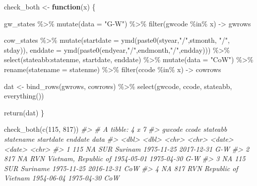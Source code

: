 \documentclass[
  11pt,
]{article}
\newenvironment{Shaded}{\begin{snugshade}}{\end{snugshade}}
\newcommand{\AttributeTok}[1]{\textcolor[rgb]{0.77,0.63,0.00}{#1}}
\newcommand{\CommentTok}[1]{\textcolor[rgb]{0.56,0.35,0.01}{\textit{#1}}}
\newcommand{\ControlFlowTok}[1]{\textcolor[rgb]{0.13,0.29,0.53}{\textbf{#1}}}
\newcommand{\DecValTok}[1]{\textcolor[rgb]{0.00,0.00,0.81}{#1}}
\newcommand{\FunctionTok}[1]{\textcolor[rgb]{0.00,0.00,0.00}{#1}}
\newcommand{\NormalTok}[1]{#1}
\newcommand{\OtherTok}[1]{\textcolor[rgb]{0.56,0.35,0.01}{#1}}
\newcommand{\SpecialCharTok}[1]{\textcolor[rgb]{0.00,0.00,0.00}{#1}}
\newcommand{\StringTok}[1]{\textcolor[rgb]{0.31,0.60,0.02}{#1}}
\begin{document}
\begin{Shaded}
\begin{Highlighting}[]
\NormalTok{check\_both }\OtherTok{\textless{}{-}} \ControlFlowTok{function}\NormalTok{(x) \{}

\NormalTok{  gw\_states }\SpecialCharTok{\%\textgreater{}\%}
    \FunctionTok{mutate}\NormalTok{(}\AttributeTok{data =} \StringTok{"G{-}W"}\NormalTok{) }\SpecialCharTok{\%\textgreater{}\%}
    \FunctionTok{filter}\NormalTok{(gwcode }\SpecialCharTok{\%in\%}\NormalTok{ x) }\OtherTok{{-}\textgreater{}}\NormalTok{ gwrows}

\NormalTok{  cow\_states }\SpecialCharTok{\%\textgreater{}\%}
    \FunctionTok{mutate}\NormalTok{(}\AttributeTok{startdate =} \FunctionTok{ymd}\NormalTok{(}\FunctionTok{paste0}\NormalTok{(styear,}\StringTok{"/"}\NormalTok{,stmonth, }\StringTok{"/"}\NormalTok{, stday)),}
           \AttributeTok{enddate =} \FunctionTok{ymd}\NormalTok{(}\FunctionTok{paste0}\NormalTok{(endyear,}\StringTok{"/"}\NormalTok{,endmonth,}\StringTok{"/"}\NormalTok{,endday))) }\SpecialCharTok{\%\textgreater{}\%}
    \FunctionTok{select}\NormalTok{(stateabb}\SpecialCharTok{:}\NormalTok{statenme, startdate, enddate) }\SpecialCharTok{\%\textgreater{}\%}
    \FunctionTok{mutate}\NormalTok{(}\AttributeTok{data =} \StringTok{"CoW"}\NormalTok{) }\SpecialCharTok{\%\textgreater{}\%}
    \FunctionTok{rename}\NormalTok{(}\AttributeTok{statename =}\NormalTok{ statenme) }\SpecialCharTok{\%\textgreater{}\%}
    \FunctionTok{filter}\NormalTok{(ccode }\SpecialCharTok{\%in\%}\NormalTok{ x) }\OtherTok{{-}\textgreater{}}\NormalTok{ cowrows}

\NormalTok{  dat }\OtherTok{\textless{}{-}} \FunctionTok{bind\_rows}\NormalTok{(gwrows, cowrows) }\SpecialCharTok{\%\textgreater{}\%}
    \FunctionTok{select}\NormalTok{(gwcode, ccode, stateabb, }\FunctionTok{everything}\NormalTok{())}

  \FunctionTok{return}\NormalTok{(dat)}
\NormalTok{\}}

\FunctionTok{check\_both}\NormalTok{(}\FunctionTok{c}\NormalTok{(}\DecValTok{115}\NormalTok{, }\DecValTok{817}\NormalTok{))}
\CommentTok{\#\textgreater{} \# A tibble: 4 x 7}
\CommentTok{\#\textgreater{}   gwcode ccode stateabb statename            startdate  enddate    data }
\CommentTok{\#\textgreater{}    \textless{}dbl\textgreater{} \textless{}dbl\textgreater{} \textless{}chr\textgreater{}    \textless{}chr\textgreater{}                \textless{}date\textgreater{}     \textless{}date\textgreater{}     \textless{}chr\textgreater{}}
\CommentTok{\#\textgreater{} 1    115    NA SUR      Surinam              1975{-}11{-}25 2017{-}12{-}31 G{-}W  }
\CommentTok{\#\textgreater{} 2    817    NA RVN      Vietnam, Republic of 1954{-}05{-}01 1975{-}04{-}30 G{-}W  }
\CommentTok{\#\textgreater{} 3     NA   115 SUR      Suriname             1975{-}11{-}25 2016{-}12{-}31 CoW  }
\CommentTok{\#\textgreater{} 4     NA   817 RVN      Republic of Vietnam  1954{-}06{-}04 1975{-}04{-}30 CoW}
\end{Highlighting}
\end{Shaded}
\end{document}
